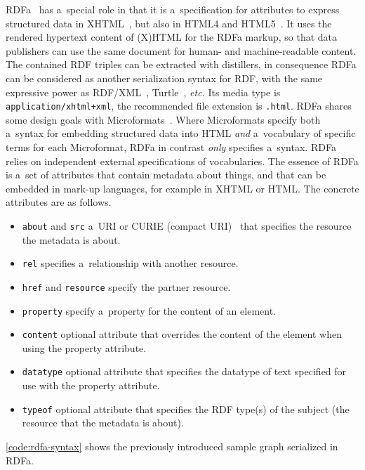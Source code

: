 RDFa~\cite{adida2012rdfa} has a~special role
in that it is a~specification for attributes
to express structured data in XHTML~\cite{pemberton2000xhtml},
but also in HTML4 and HTML5~\cite{sporny2012htmlrdfa}.
It uses the rendered hypertext content of (X)HTML
for the RDFa markup,
so that data publishers can use the same document
for human- and machine-readable content.
The contained RDF triples can be extracted with distillers,
in consequence RDFa can be considered
as another serialization syntax for RDF,
with the same expressive power as
RDF/XML~\cite{beckett2004rdfxml},
Turtle~\cite{prudhommeaux2011turtle}, \emph{etc.}
Its media type is \texttt{application/xhtml+xml},
the recommended file extension is \texttt{.html}.
RDFa shares some design goals
with Microformats~\cite{celik2006microformats}.
Where Microformats specify both a~syntax
for embedding structured data into HTML
\emph{and} a~vocabulary of specific terms for each Microformat,
RDFa in contrast \emph{only} specifies a~syntax.
RDFa relies on independent external specifications of vocabularies.
The essence of RDFa is a~set of attributes
that contain metadata about things,
and that can be embedded in mark-up languages,
for example in XHTML or HTML.
The concrete attributes are as follows.

\begin{itemize}
  \item \texttt{about} and \texttt{src} a~URI or
        CURIE (compact URI)~\cite{birbeck2007curie}
        that specifies the resource
        the metadata is about.
  \item \texttt{rel} specifies a~relationship with
        another resource.
  \item \texttt{href} and \texttt{resource} specify
        the partner resource.
  \item \texttt{property} specify a~property for
        the content of an element.
  \item \texttt{content} optional attribute that overrides
        the content of the element when using
        the property attribute.
  \item \texttt{datatype} optional attribute that
        specifies the datatype of text specified
        for use with the property attribute.
  \item \texttt{typeof} optional attribute that specifies
        the RDF type(s) of the subject (the resource
        that the metadata is about).
\end{itemize}

\autoref{code:rdfa-syntax} shows the previously introduced
sample graph serialized in RDFa.


